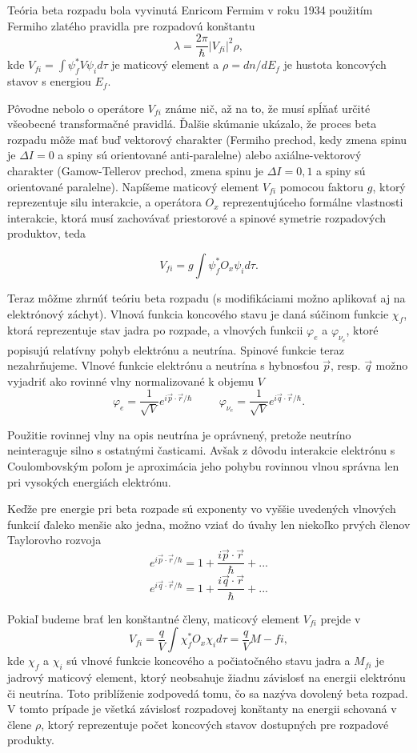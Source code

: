 \documentclass[../../main.tex]{subfiles}
\begin{document}
Teória beta rozpadu bola vyvinutá Enricom Fermim v roku 1934 použitím Fermiho zlatého pravidla pre rozpadovú konštantu
$$ \lambda = \frac{2\pi}{\hbar}\vert V_{fi} \vert^2 \rho, $$
kde $V_{fi} = \int \psi^{*}_f V \psi_i d\tau$ je maticový element a $\rho = dn/dE_f$ je hustota koncových stavov s energiou $E_f$.

Pôvodne nebolo o operátore $V_{fi}$ známe nič, až na to, že musí spĺňať určité všeobecné transformačné pravidlá. Ďalšie skúmanie ukázalo, že proces beta rozpadu môže mať buď vektorový charakter (Fermiho prechod, kedy zmena spinu je $\Delta I = 0$ a spiny sú orientované anti-paralelne) alebo axiálne-vektorový charakter (Gamow-Tellerov prechod, zmena spinu je $\Delta I = 0,1$ a spiny sú orientované paralelne). Napíšeme maticový element $V_{fi}$ pomocou faktoru $g$, ktorý reprezentuje silu interakcie, a operátora $O_x$ reprezentujúceho formálne vlastnosti interakcie, ktorá musí zachovávať priestorové a spinové symetrie rozpadových produktov, teda

$$ V_{fi} = g \int \psi^{*}_f O_x \psi_i d\tau. $$

Teraz môžme zhrnúť teóriu beta rozpadu (s modifikáciami možno aplikovať aj na elektrónový záchyt). Vlnová funkcia koncového stavu je daná súčinom funkcie $\chi_f$, ktorá reprezentuje stav jadra po rozpade, a vlnových funkcii $\varphi_e$ a $\varphi_{\nu_e}$, ktoré popisujú relatívny pohyb elektrónu a neutrína. Spinové funkcie teraz nezahrňujeme. Vlnové funkcie elektrónu a neutrína s hybnosťou $\vec{p}$, resp. $\vec{q}$ možno vyjadriť ako rovinné vlny normalizované k objemu $V$
$$ \varphi_e = \frac{1}{\sqrt{V}}e^{i\vec{p}\cdot \vec{r}/\hbar}  \hspace{1cm}  \varphi_{\nu_e} = \frac{1}{\sqrt{V}}e^{i\vec{q}\cdot \vec{r}/\hbar}. $$

Použitie rovinnej vlny na opis neutrína je oprávnený, pretože neutríno neinteraguje silno s ostatnými časticami. Avšak z dôvodu interakcie elektrónu s Coulombovským poľom je aproximácia jeho pohybu rovinnou vlnou správna len pri vysokých energiách elektrónu.

Keďže pre energie pri beta rozpade sú exponenty vo vyššie uvedených vlnových funkcií ďaleko menšie ako jedna, možno vziať do úvahy len niekoľko prvých členov Taylorovho rozvoja
$$ e^{i\vec{p}\cdot \vec{r}/\hbar} = 1+ \frac{i\vec{p}\cdot\vec{r}}{\hbar} +...$$
$$ e^{i\vec{q}\cdot \vec{r}/\hbar} = 1+ \frac{i\vec{q}\cdot\vec{r}}{\hbar} +...$$

Pokiaľ budeme brať len konštantné členy, maticový element $V_{fi}$ prejde v
$$ V_{fi}=\frac{q}{V} \int \chi_f^{*}O_x\chi_i d\tau = \frac{q}{V}M-{fi},$$
kde $\chi_f$ a $\chi_i$ sú vlnové funkcie koncového a počiatočného stavu jadra a $M_{fi}$ je jadrový maticový element, ktorý neobsahuje žiadnu závislosť na energii elektrónu či neutrína. Toto priblíženie zodpovedá tomu, čo sa nazýva dovolený beta rozpad. V tomto prípade je všetká závislosť rozpadovej konštanty na energii schovaná v člene $\rho$, ktorý reprezentuje počet koncových stavov dostupných pre rozpadové produkty.
\end{document}
